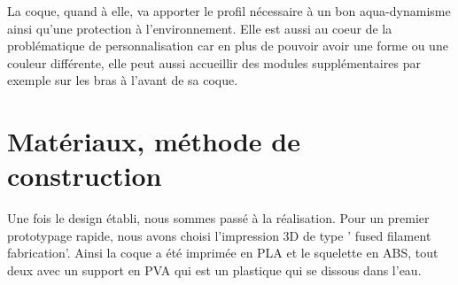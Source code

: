 \documentclass[a4paper,11pt]{report}
\begin{document}
			La coque, quand à elle, va apporter le profil nécessaire à un bon aqua-dynamisme ainsi qu'une protection à l'environnement. Elle est aussi au coeur de la problématique de personnalisation car en plus de pouvoir avoir une forme ou une couleur différente, elle peut aussi accueillir des modules supplémentaires par exemple sur les bras à l'avant de sa coque.
			
			\section{Matériaux, méthode de construction}
			
			Une fois le design établi, nous sommes passé à la réalisation. Pour un premier prototypage rapide, nous avons choisi l'impression 3D de type ' fused filament fabrication'. Ainsi la coque a été imprimée en PLA et le squelette en ABS, tout deux avec un support en PVA qui est un plastique qui se dissous dans l'eau.
			
\end{document}
